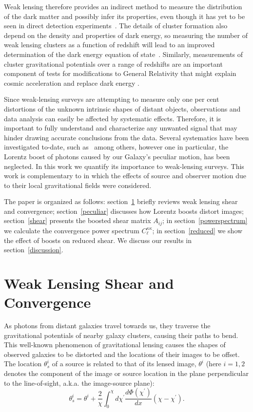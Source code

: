 \documentclass[useAMS,fleqn, usenatbib]{mn2e}
\begin{document}
Weak lensing therefore provides an indirect method to measure the  distribution of the dark matter and possibly
infer its properties, even though it has yet to be seen in direct detection experiments~\citep{Wright:1999jc}. 
The details of cluster formation also depend on the  density and properties of dark energy,
so  measuring the number of weak lensing clusters as a function of redshift 
will lead to an improved determination of the dark energy equation of state~\citep{Schneider:2005ka}. 
Similarly, measurements of cluster gravitational potentials over a range of redshifts 
are an important component of tests for modifications to General Relativity that might explain cosmic
acceleration and replace dark energy \citep{Lue:2004rj, Bean:2010zq}.

Since weak-lensing surveys are attempting to measure only one per cent distortions 
of the unknown intrinsic shapes of distant objects, observations and data analysis  
can easily be affected by systematic effects. Therefore,
it is important to fully understand and characterize any unwanted signal that
may hinder drawing accurate conclusions from the data. Several systematics have been investigated
to-date, such as~\citep{Cunha:2012us,Chang:2012cp,Yoo:2012vm,Chang:2012cn} among others, however one in particular,
the Lorentz boost of photons caused by our Galaxy's peculiar motion, has been neglected.
In this work we quantify its importance to weak-lensing surveys. This work is complementary to \citep{Bonvin:2008ni} in which the effects of source and observer motion due to their local gravitational fields were considered.

The paper is organized as follows: section~\ref{wl_background} briefly reviews
weak lensing shear and convergence; section~\ref{peculiar}   discusses how Lorentz boosts distort images;
section~\ref{shear} presents
the boosted shear matrix $A_{ij}$; in section~\ref{powerspectrum} we calculate the convergence
power spectrum $C_{\ell}^{\kappa\kappa}$; in section~\ref{reduced} we show the effect of 
boosts on reduced shear. We discuss our results in section~\ref{discussion}.


\section{Weak Lensing Shear and Convergence}
\label{wl_background}

As photons from distant galaxies travel towards us, they  traverse the gravitational
potentials of nearby galaxy clusters, causing their paths  to bend. This well-known phenomenon of
gravitational lensing causes the shapes of  observed galaxies to be distorted and the locations of their
images to be offset.  The location  $\theta_s^i$ of a source
 is related to that of its  lensed image, $\theta^i$ 
 (here $i=1,2$ denotes the  component of the image or source location in the plane
 perpendicular to the line-of-sight, a.k.a. the image-source plane):
\begin{equation}\label{theta}
\theta_s^i=\theta^i+\frac{2}{\chi}\int_0^\chi d\chi^\prime \frac{d\Phi(\chi^{\prime})}{dx}\left(\chi - 
\chi^\prime \right).
\end{equation}
\end{document}
